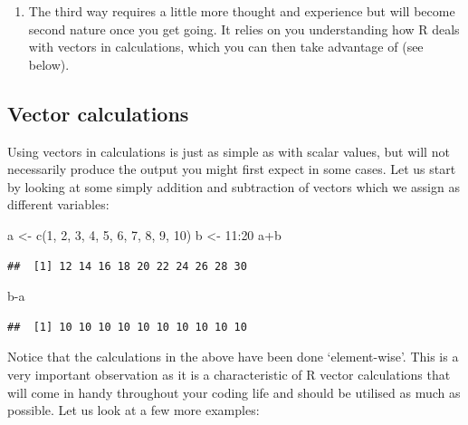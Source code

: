 \documentclass[
]{book}
\newenvironment{Shaded}{\begin{snugshade}}{\end{snugshade}}
\newcommand{\DecValTok}[1]{\textcolor[rgb]{0.00,0.00,0.81}{#1}}
\newcommand{\FunctionTok}[1]{\textcolor[rgb]{0.00,0.00,0.00}{#1}}
\newcommand{\NormalTok}[1]{#1}
\newcommand{\OtherTok}[1]{\textcolor[rgb]{0.56,0.35,0.01}{#1}}
\newcommand{\SpecialCharTok}[1]{\textcolor[rgb]{0.00,0.00,0.00}{#1}}
\providecommand{\tightlist}{%
  \setlength{\itemsep}{0pt}\setlength{\parskip}{0pt}}
\theoremstyle{definition}
\theoremstyle{definition}
\theoremstyle{definition}
\theoremstyle{definition}
\theoremstyle{remark}
\begin{document}
\begin{enumerate}
\def\labelenumi{\arabic{enumi}.}
\setcounter{enumi}{2}
\tightlist
\item
  The third way requires a little more thought and experience but will become second nature once you get going. It relies on you understanding how R deals with vectors in calculations, which you can then take advantage of (see below).
\end{enumerate}

\hypertarget{vector-calculations}{%
\subsection{Vector calculations}\label{vector-calculations}}

Using vectors in calculations is just as simple as with scalar values, but will not necessarily produce the output you might first expect in some cases. Let us start by looking at some simply addition and subtraction of vectors which we assign as different variables:

\begin{Shaded}
\begin{Highlighting}[]
\NormalTok{a }\OtherTok{\textless{}{-}} \FunctionTok{c}\NormalTok{(}\DecValTok{1}\NormalTok{, }\DecValTok{2}\NormalTok{, }\DecValTok{3}\NormalTok{, }\DecValTok{4}\NormalTok{, }\DecValTok{5}\NormalTok{, }\DecValTok{6}\NormalTok{, }\DecValTok{7}\NormalTok{, }\DecValTok{8}\NormalTok{, }\DecValTok{9}\NormalTok{, }\DecValTok{10}\NormalTok{)}
\NormalTok{b }\OtherTok{\textless{}{-}} \DecValTok{11}\SpecialCharTok{:}\DecValTok{20}
\NormalTok{a}\SpecialCharTok{+}\NormalTok{b}
\end{Highlighting}
\end{Shaded}

\begin{verbatim}
##  [1] 12 14 16 18 20 22 24 26 28 30
\end{verbatim}

\begin{Shaded}
\begin{Highlighting}[]
\NormalTok{b}\SpecialCharTok{{-}}\NormalTok{a}
\end{Highlighting}
\end{Shaded}

\begin{verbatim}
##  [1] 10 10 10 10 10 10 10 10 10 10
\end{verbatim}

Notice that the calculations in the above have been done `element-wise'. This is a very important observation as it is a characteristic of R vector calculations that will come in handy throughout your coding life and should be utilised as much as possible. Let us look at a few more examples:
\end{document}
